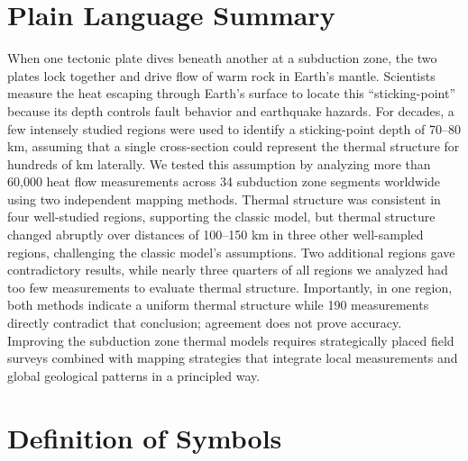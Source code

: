 \documentclass[draft,linenumbers]{agujournal2019}
\begin{document}
\section*{Plain Language Summary}
When one tectonic plate dives beneath another at a subduction zone, the
two plates lock together and drive flow of warm rock in Earth's mantle.
Scientists measure the heat escaping through Earth's surface to locate
this ``sticking-point'' because its depth controls fault behavior and
earthquake hazards. For decades, a few intensely studied regions were
used to identify a sticking-point depth of 70--80 km, assuming that a
single cross-section could represent the thermal structure for hundreds
of km laterally. We tested this assumption by analyzing more than 60,000
heat flow measurements across 34 subduction zone segments worldwide
using two independent mapping methods. Thermal structure was consistent
in four well-studied regions, supporting the classic model, but thermal
structure changed abruptly over distances of 100--150 km in three other
well-sampled regions, challenging the classic model's assumptions. Two
additional regions gave contradictory results, while nearly three
quarters of all regions we analyzed had too few measurements to evaluate
thermal structure. Importantly, in one region, both methods indicate a
uniform thermal structure while 190 measurements directly contradict
that conclusion; agreement does not prove accuracy. Improving the
subduction zone thermal models requires strategically placed field
surveys combined with mapping strategies that integrate local
measurements and global geological patterns in a principled way.

\clearpage

\section*{Definition of Symbols}\label{sec:symbols}
\end{document}

